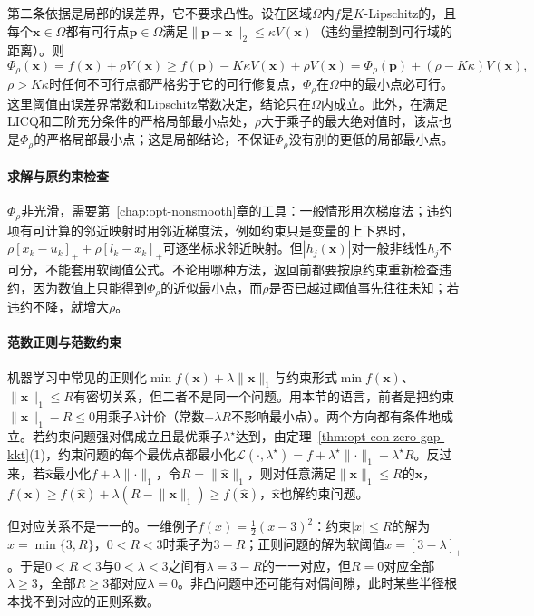第二条依据是局部的误差界，它不要求凸性。设在区域$\Omega$内$f$是$K$-Lipschitz的，且每个$\bm x\in\Omega$都有可行点$\bm p\in\Omega$满足$\lVert\bm p-\bm x\rVert_2\leq\kappa V(\bm x)$（违约量控制到可行域的距离）。则
\[
  \Phi_\rho(\bm x)=f(\bm x)+\rho V(\bm x)\geq f(\bm p)-K\kappa V(\bm x)+\rho V(\bm x)=\Phi_\rho(\bm p)+(\rho-K\kappa)V(\bm x),
\]
$\rho>K\kappa$时任何不可行点都严格劣于它的可行修复点，$\Phi_\rho$在$\Omega$中的最小点必可行。这里阈值由误差界常数和Lipschitz常数决定，结论只在$\Omega$内成立。此外，在满足LICQ和二阶充分条件的严格局部最小点处，$\rho$大于乘子的最大绝对值时，该点也是$\Phi_\rho$的严格局部最小点；这是局部结论，不保证$\Phi_\rho$没有别的更低的局部最小点。

\paragraph{求解与原约束检查}
$\Phi_\rho$非光滑，需要第~\ref{chap:opt-nonsmooth}章的工具：一般情形用次梯度法；违约项有可计算的邻近映射时用邻近梯度法，例如约束只是变量的上下界时，$\rho[x_k-u_k]_++\rho[l_k-x_k]_+$可逐坐标求邻近映射。但$|h_j(\bm x)|$对一般非线性$h_j$不可分，不能套用软阈值公式。不论用哪种方法，返回前都要按原约束重新检查违约，因为数值上只能得到$\Phi_\rho$的近似最小点，而$\rho$是否已越过阈值事先往往未知；若违约不降，就增大$\rho$。

\paragraph{范数正则与范数约束}
机器学习中常见的正则化$\min f(\bm x)+\lambda\lVert\bm x\rVert_1$与约束形式$\min f(\bm x)$、$\lVert\bm x\rVert_1\leq R$有密切关系，但二者不是同一个问题。用本节的语言，前者是把约束$\lVert\bm x\rVert_1-R\leq0$用乘子$\lambda$计价（常数$-\lambda R$不影响最小点）。两个方向都有条件地成立。若约束问题强对偶成立且最优乘子$\lambda^\star$达到，由定理~\ref{thm:opt-con-zero-gap-kkt}(1)，约束问题的每个最优点都最小化$\mathcal L(\cdot,\lambda^\star)=f+\lambda^\star\lVert\cdot\rVert_1-\lambda^\star R$。反过来，若$\hat{\bm x}$最小化$f+\lambda\lVert\cdot\rVert_1$，令$R=\lVert\hat{\bm x}\rVert_1$，则对任意满足$\lVert\bm x\rVert_1\leq R$的$\bm x$，$f(\bm x)\geq f(\hat{\bm x})+\lambda(R-\lVert\bm x\rVert_1)\geq f(\hat{\bm x})$，$\hat{\bm x}$也解约束问题。

但对应关系不是一一的。一维例子$f(x)=\frac12(x-3)^2$：约束$|x|\leq R$的解为$x=\min\{3,R\}$，$0<R<3$时乘子为$3-R$；正则问题的解为软阈值$x=[3-\lambda]_+$。于是$0<R<3$与$0<\lambda<3$之间有$\lambda=3-R$的一一对应，但$R=0$对应全部$\lambda\geq3$，全部$R\geq3$都对应$\lambda=0$。非凸问题中还可能有对偶间隙，此时某些半径根本找不到对应的正则系数。
